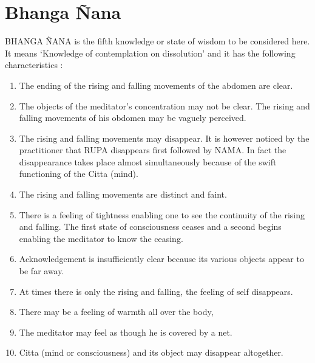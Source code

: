 \documentclass[a5paper,10pt,english]{book}
\begin{document}
\section{Bhanga Ñana}
\label{\detokenize{progress:bhanga-nana}}
\sphinxAtStartPar
BHANGA ÑANA is the fifth knowledge or state of wisdom to be considered here. It means ‘Knowledge of contemplation on dissolution’ and it has the following characteristics :\sphinxhyphen{}
\begin{enumerate}
%
\item {} 
\sphinxAtStartPar
The ending of the rising and falling movements of the abdomen are clear.

\item {} 
\sphinxAtStartPar
The objects of the meditator’s concentration may not be clear. The rising and falling movements of his obdomen may be vaguely perceived.

\item {} 
\sphinxAtStartPar
The rising and falling movements may disappear. It is however noticed by the practitioner that RUPA disappears first followed by NAMA. In fact the disappearance takes place almost simultaneously because of the swift functioning of the Citta (mind).

\item {} 
\sphinxAtStartPar
The rising and falling movements are distinct and faint.

\item {} 
\sphinxAtStartPar
There is a feeling of tightness enabling one to see the continuity of the rising and falling. The first state of consciousness ceases and a second begins enabling the meditator to know the ceasing.

\item {} 
\sphinxAtStartPar
Acknowledgement is insufficiently clear because its various objects appear to be far away.

\item {} 
\sphinxAtStartPar
At times there is only the rising and falling, the feeling of self disappears.

\item {} 
\sphinxAtStartPar
There may be a feeling of warmth all over the body,

\item {} 
\sphinxAtStartPar
The meditator may feel as though he is covered by a net.

\item {} 
\sphinxAtStartPar
Citta (mind or consciousness) and its object may disappear altogether.


\end{enumerate}
\end{document}
